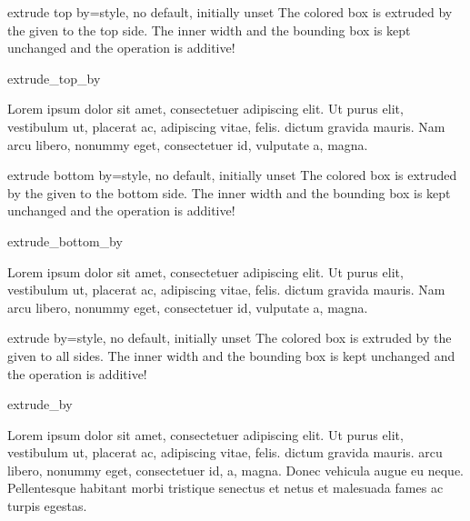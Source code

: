 \clearpage
\begin{docTcbKey}{extrude top by}{=}{style, no default, initially unset}
  The colored box is extruded by the given  to the top side.
  The inner width and the bounding box is kept unchanged and the operation
  is additive!
\begin{exdispExample}{extrude_top_by}

Lorem ipsum dolor sit amet, consectetuer adipiscing elit. Ut purus elit,
vestibulum ut, placerat ac, adipiscing vitae, felis.
 dictum gravida mauris.
Nam arcu libero, nonummy eget, consectetuer id, vulputate a, magna.
\end{exdispExample}
\end{docTcbKey}

\begin{docTcbKey}{extrude bottom by}{=}{style, no default, initially unset}
  The colored box is extruded by the given  to the bottom side.
  The inner width and the bounding box is kept unchanged and the operation
  is additive!
\begin{exdispExample}[safety=1cm]{extrude_bottom_by}

Lorem ipsum dolor sit amet, consectetuer adipiscing elit. Ut purus elit,
vestibulum ut, placerat ac, adipiscing vitae, felis.
 dictum gravida mauris.
Nam arcu libero, nonummy eget, consectetuer id, vulputate a, magna.
\end{exdispExample}
\end{docTcbKey}

\begin{docTcbKey}{extrude by}{=}{style, no default, initially unset}
  The colored box is extruded by the given  to all sides.
  The inner width and the bounding box is kept unchanged and the operation
  is additive!
\begin{exdispExample}{extrude_by}

Lorem ipsum dolor sit amet, consectetuer adipiscing elit. Ut purus elit,
vestibulum ut, placerat ac, adipiscing vitae, felis.  dictum
gravida mauris. 
arcu libero, nonummy eget, consectetuer id,  a, magna. Donec
vehicula augue eu neque. Pellentesque habitant morbi tristique senectus et netus
et malesuada fames ac turpis egestas. 
\end{exdispExample}
\end{docTcbKey}

